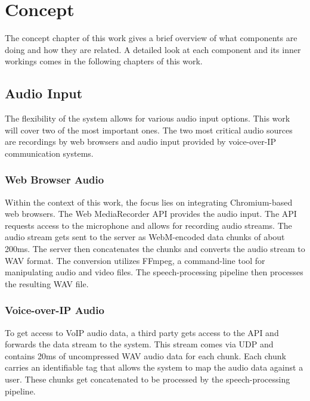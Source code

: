 \chapter{Concept}

\label{Chapter2}

The concept chapter of this work gives a brief overview of what components are doing and how they are related. 
A detailed look at each component and its inner workings comes in the following chapters of this work.



\section{Audio Input}

The flexibility of the system allows for various audio input options. This work will cover two of the most important 
ones. The two most critical audio sources are recordings by web browsers and audio input provided by voice-over-IP 
communication systems.

\subsection{Web Browser Audio}

Within the context of this work, the focus lies on integrating Chromium-based web browsers. The Web MediaRecorder API 
provides the audio input. The API requests access to the microphone and allows for recording audio streams. 
The audio stream gets sent to the server as WebM-encoded data chunks of about 200ms. The server then concatenates the 
chunks and converts the audio stream to WAV format. The conversion utilizes FFmpeg, a command-line tool for 
manipulating audio and video files. The speech-processing pipeline then processes the resulting WAV file.

\subsection{Voice-over-IP Audio}

To get access to VoIP audio data, a third party gets access to the API and forwards the data stream to the system. 
This stream comes via UDP and contains 20ms of uncompressed WAV audio data for each chunk.
Each chunk carries an identifiable tag that allows the system to map the audio data against a user.
These chunks get concatenated to be processed by the speech-processing pipeline.

